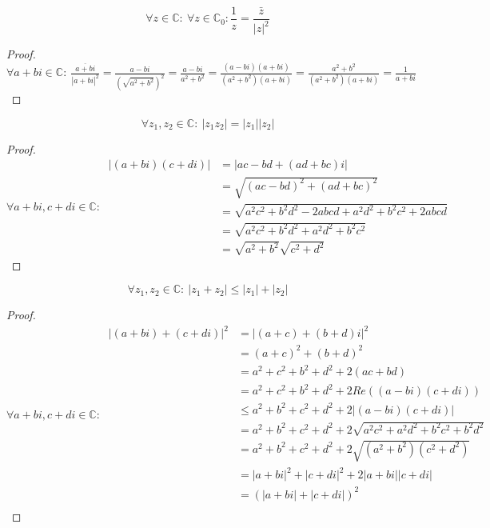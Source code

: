 \documentclass[main.tex]{subfiles}
\begin{document}
\begin{pr}
  \[ \forall z\in \mathbb{C}:\ \forall z \in \mathbb{C}_{0}: \frac{1}{z} = \frac{\bar{z}}{|z|^{2}} \]

  \begin{proof}
    $\forall a+bi\in \mathbb{C}:\ \frac{\overline{a+bi}}{|a+bi|^{2}} = \frac{a-bi}{\left(\sqrt{a^{2}+b^{2}}\right)^{2}} = \frac{a-bi}{a^{2}+b^{2}}= \frac{(a-bi)(a+bi)}{(a^{2}+b^{2})(a+bi)} = \frac{a^{2}+b^{2}}{(a^{2}+b^{2})(a+bi)} = \frac{1}{a+bi}$
  \end{proof}
\end{pr}

\begin{pr}
  \[ \forall z_{1},z_{2}\in \mathbb{C}:\ |z_{1}z_{2}| = |z_{1}||z_{2}| \]

  \begin{proof}
    \[
    \forall a+bi,c+di \in \mathbb{C}:\
    \begin{array}{rll}
      |(a+bi)(c+di)| &= |ac-bd + (ad+bc)i|\\
      &= \sqrt{(ac-bd)^{2} + (ad+bc)^{2}}\\
      &= \sqrt{a^{2}c^{2} +b^{2}d^{2}-2abcd + a^{2}d^{2} + b^{2}c^{2} +2abcd}\\
      &= \sqrt{a^{2}c^{2} +b^{2}d^{2} + a^{2}d^{2} + b^{2}c^{2}}\\
      &= \sqrt{a^{2}+b^{2}}\sqrt{c^{2}+d^{2}}
    \end{array}
    \]
  \end{proof}
\end{pr}

\begin{pr}
  \[ \forall z_{1},z_{2}\in \mathbb{C}:\ |z_{1}+z_{2}| \le |z_{1}|+|z_{2}| \]

  \begin{proof}
    \[
    \forall a+bi,c+di \in \mathbb{C}:\
    \begin{array}{rll}
      |(a+bi)+(c+di)|^{2} &= |(a+c)+(b+d)i|^{2}\\
      &= (a+c)^{2}+ (b+d)^{2}\\
      &= a^{2}+c^{2} + b^{2}+d^{2}+2(ac + bd)\\
      &= a^{2}+c^{2} + b^{2}+d^{2}+2Re((a-bi)(c+di))\\
      &\le a^{2}+b^{2} + c^{2}+d^{2} + 2|(a-bi)(c+di)|\\
      &= a^{2}+b^{2} + c^{2}+d^{2} + 2\sqrt{a^{2}c^{2} + a^{2}d^{2} +b^{2}c^{2}+ b^{2}d^{2}}\\
      &= a^{2}+b^{2} + c^{2}+d^{2} + 2\sqrt{(a^{2}+b^{2})(c^{2}+d^{2})}\\
      &= |a+bi|^{2} + |c+di|^{2} + 2|a+bi||c+di|\\
      &= \left(|a+bi|+|c+di|\right)^{2}\\
    \end{array}
    \]
  \end{proof}
\end{pr}
\end{document}
